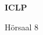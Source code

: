 \documentclass[a4paper]{article}
\begin{document}
\printGenericVSLHeader
\begin{center}
\begin{vsltext}{3cm}{4cm}

   \vspace{0.5cm} 

    \textbf{ICLP} 

    \vspace{1.5cm}

    Hörsaal 8

\end{vsltext}

\end{center}
\end{document}
